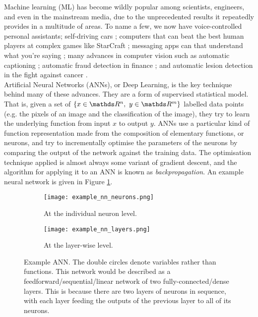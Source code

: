 Machine learning (ML) has become wildly popular among scientists, engineers, and even in the mainstream media, due to the unprecedented results it repeatedly provides in a multitude of areas. To name a few, we now have voice-controlled personal assistants; self-driving cars \cite{Fridman2019MITAutomation}; computers that can beat the best human players at complex games like StarCraft \cite{Vinyals2017StarCraftLearning}; messaging apps can that understand what you're saying \cite{Abdulkader2016IntroducingEngineering, NIPS2015_5782}; many advances in computer vision such as automatic captioning \cite{Karpathy2017DeepDescriptions}; automatic fraud detection in finance \cite{DalPozzolo2015AdaptiveDetection}; and automatic lesion detection in the fight against cancer \cite{Zlocha2019UniversalScans}. \\

Artificial Neural Networks (ANNs), or Deep Learning, is the key technique behind many of these advances. They are a form of supervised statistical model. That is, given a set of \(\{x \in \R^n, \ y \in \R^m\}\) labelled data points (e.g. the pixels of an image and the classification of the image), they try to learn the underlying function from input \(x\) to output \(y\). ANNs use a particular kind of function representation made from the composition of elementary functions, or neurons, and try to incrementally optimise the parameters of the neurons by comparing the output of the network against the training data. The optimisation technique applied is almost always some variant of gradient descent, and the algorithm for applying it to an ANN is known as \textit{backpropagation}. An example neural network is given in Figure \ref{fig:1-example-net}. \\

\begin{figure}[h!]
    \centering
    \hspace{0.5cm}
    \begin{subfigure}[]{0.4\textwidth}
        \centering
        \texttt{[image: example\_nn\_neurons.png]}
        \caption{At the individual neuron level.}
    \end{subfigure}
    \hfill
    \begin{subfigure}[]{0.4\textwidth}
        \centering
        \texttt{[image: example\_nn\_layers.png]}
        \caption{At the layer-wise level.}
    \end{subfigure}%
    \hspace{0.5cm}
    \caption{Example ANN. The double circles denote variables rather than functions. This network would be described as a feedforward/sequential/linear network of two fully-connected/dense layers. This is because there are two layers of neurons in sequence, with each layer feeding the outputs of the previous layer to all of its neurons.}
    \label{fig:1-example-net}
\end{figure}

